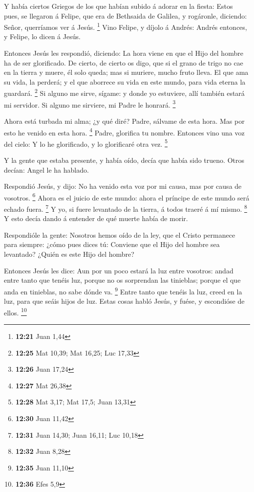  Y había ciertos Griegos de los que habían subido á adorar
en la fiesta:  Estos pues, se llegaron á Felipe, que era de
Bethsaida de Galilea, y rogáronle, diciendo: Señor, querríamos ver á
Jesús. \footnote{\textbf{12:21} Juan 1,44}  Vino Felipe, y
díjolo á Andrés: Andrés entonces, y Felipe, lo dicen á Jesús.

 Entonces Jesús les respondió, diciendo: La hora viene en
que el Hijo del hombre ha de ser glorificado.  De cierto,
de cierto os digo, que si el grano de trigo no cae en la tierra y muere,
él solo queda; mas si muriere, mucho fruto lleva.  El que
ama su vida, la perderá; y el que aborrece su vida en este mundo, para
vida eterna la guardará. \footnote{\textbf{12:25} Mat 10,39; Mat 16,25;
  Luc 17,33}  Si alguno me sirve, sígame: y donde yo
estuviere, allí también estará mi servidor. Si alguno me sirviere, mi
Padre le honrará. \footnote{\textbf{12:26} Juan 17,24}

 Ahora está turbada mi alma; ¿y qué diré? Padre, sálvame de
esta hora. Mas por esto he venido en esta hora. \footnote{\textbf{12:27}
  Mat 26,38}  Padre, glorifica tu nombre. Entonces vino una
voz del cielo: Y lo he glorificado, y lo glorificaré otra vez.
\footnote{\textbf{12:28} Mat 3,17; Mat 17,5; Juan 13,31}

 Y la gente que estaba presente, y había oído, decía que
había sido trueno. Otros decían: Angel le ha hablado.

 Respondió Jesús, y dijo: No ha venido esta voz por mi
causa, mas por causa de vosotros. \footnote{\textbf{12:30} Juan 11,42}
 Ahora es el juicio de este mundo: ahora el príncipe de
este mundo será echado fuera. \footnote{\textbf{12:31} Juan 14,30; Juan
  16,11; Luc 10,18}  Y yo, si fuere levantado de la tierra,
á todos traeré á mí mismo. \footnote{\textbf{12:32} Juan 8,28}
 Y esto decía dando á entender de qué muerte había de
morir.

 Respondióle la gente: Nosotros hemos oído de la ley, que
el Cristo permanece para siempre: ¿cómo pues dices tú: Conviene que el
Hijo del hombre sea levantado? ¿Quién es este Hijo del hombre?

 Entonces Jesús les dice: Aun por un poco estará la luz
entre vosotros: andad entre tanto que tenéis luz, porque no os
sorprendan las tinieblas; porque el que anda en tinieblas, no sabe dónde
va. \footnote{\textbf{12:35} Juan 11,10}  Entre tanto que
tenéis la luz, creed en la luz, para que seáis hijos de luz. Estas cosas
habló Jesús, y fuése, y escondióse de ellos. \footnote{\textbf{12:36}
  Efes 5,9}

